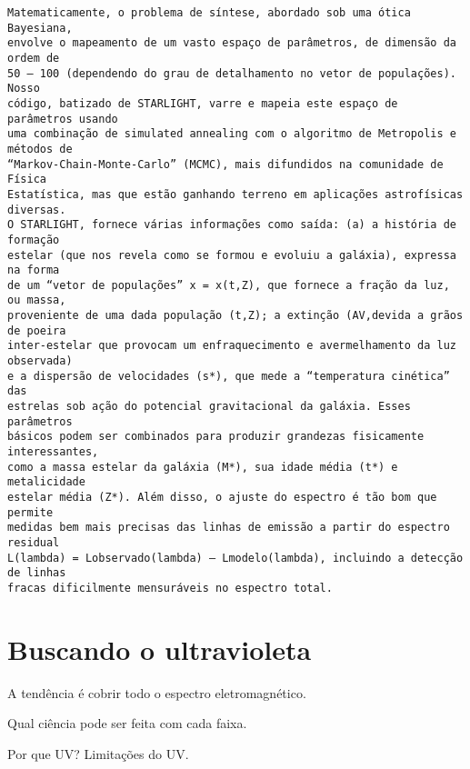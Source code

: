 \begin{verbatim}
Matematicamente, o problema de síntese, abordado sob uma ótica Bayesiana,
envolve o mapeamento de um vasto espaço de parâmetros, de dimensão da ordem de
50 – 100 (dependendo do grau de detalhamento no vetor de populações).  Nosso
código, batizado de STARLIGHT, varre e mapeia este espaço de parâmetros usando
uma combinação de simulated annealing com o algoritmo de Metropolis e métodos de
“Markov-Chain-Monte-Carlo” (MCMC), mais difundidos na comunidade de Física
Estatística, mas que estão ganhando terreno em aplicações astrofísicas diversas.
O STARLIGHT, fornece várias informações como saída: (a) a história de formação
estelar (que nos revela como se formou e evoluiu a galáxia), expressa na forma
de um “vetor de populações” x = x(t,Z), que fornece a fração da luz, ou massa,
proveniente de uma dada população (t,Z); a extinção (AV,devida a grãos de poeira
inter-estelar que provocam um enfraquecimento e avermelhamento da luz observada)
e a dispersão de velocidades (s*), que mede a “temperatura cinética” das
estrelas sob ação do potencial gravitacional da galáxia. Esses parâmetros
básicos podem ser combinados para produzir grandezas fisicamente interessantes,
como a massa estelar da galáxia (M*), sua idade média (t*) e metalicidade
estelar média (Z*). Além disso, o ajuste do espectro é tão bom que permite
medidas bem mais precisas das linhas de emissão a partir do espectro residual
L(lambda) = Lobservado(lambda) – Lmodelo(lambda), incluindo a detecção de linhas
fracas dificilmente mensuráveis no espectro total.

\end{verbatim}



\section{Buscando o ultravioleta}
\label{sec:Intro:UV}


A tendência é cobrir todo o espectro eletromagnético.

Qual ciência pode ser feita com cada faixa.

Por que UV? Limitações do UV.

